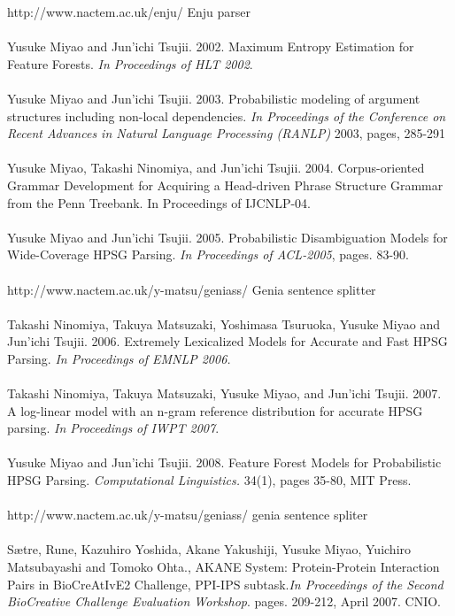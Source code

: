 \big[50\big] http://www.nactem.ac.uk/enju/ Enju parser \\  \\
\big[51\big] Yusuke Miyao and Jun'ichi Tsujii. 2002. Maximum Entropy Estimation for Feature Forests. \emph{In Proceedings of HLT 2002}.\\  \\
\big[52\big] Yusuke Miyao and Jun'ichi Tsujii. 2003. Probabilistic modeling of argument structures including non-local dependencies. \emph{In Proceedings of the Conference on Recent Advances in Natural Language Processing (RANLP)} 2003, pages, 285-291 \\  \\
\big[53\big] Yusuke Miyao, Takashi Ninomiya, and Jun'ichi Tsujii. 2004. Corpus-oriented Grammar Development for Acquiring a Head-driven Phrase Structure Grammar from the Penn Treebank. In Proceedings of IJCNLP-04.\\  \\
\big[54\big] Yusuke Miyao and Jun'ichi Tsujii. 2005. Probabilistic Disambiguation Models for Wide-Coverage HPSG Parsing. \emph{In Proceedings of ACL-2005}, pages. 83-90.\\  \\
\big[55\big] http://www.nactem.ac.uk/y-matsu/geniass/ Genia sentence splitter\\  \\
\big[56\big] Takashi Ninomiya, Takuya Matsuzaki, Yoshimasa Tsuruoka, Yusuke Miyao and Jun'ichi Tsujii. 2006. Extremely Lexicalized Models for Accurate and Fast HPSG Parsing. \emph{In Proceedings of EMNLP 2006.}\\  \\
\big[57\big] Takashi Ninomiya, Takuya Matsuzaki, Yusuke Miyao, and Jun'ichi Tsujii. 2007. A log-linear model with an n-gram reference distribution for accurate HPSG parsing. \emph{In Proceedings of IWPT 2007}.\\  \\
\big[58\big] Yusuke Miyao and Jun'ichi Tsujii. 2008. Feature Forest Models for Probabilistic HPSG Parsing. \emph{Computational Linguistics.} 34(1), pages 35-80, MIT Press.\\  \\
\big[59\big] http://www.nactem.ac.uk/y-matsu/geniass/ genia sentence spliter\\  \\
\big[60\big] Sætre, Rune, Kazuhiro Yoshida, Akane Yakushiji, Yusuke Miyao, Yuichiro Matsubayashi and Tomoko Ohta., AKANE System: Protein-Protein Interaction Pairs in BioCreAtIvE2 Challenge, PPI-IPS subtask.\emph{In Proceedings of the Second BioCreative Challenge Evaluation Workshop}. pages. 209-212, April 2007. CNIO. \\  \\
